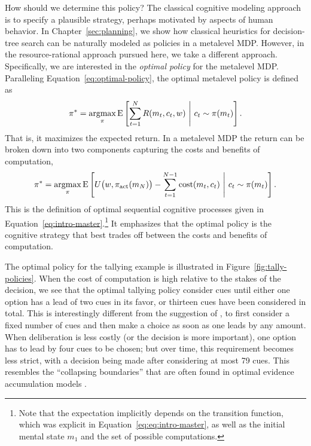 How should we determine this policy? The classical cognitive modeling approach is to specify a plausible strategy, perhaps motivated by aspects of human behavior. In Chapter~\ref{sec:planning}, we show how classical heuristics for decision-tree search can be naturally modeled as policies in a metalevel MDP. However, in the resource-rational approach pursued here, we take a different approach. Specifically, we are interested in the \emph{optimal policy} for the metalevel MDP. Paralleling Equation~\ref{eq:optimal-policy}, the optimal metalevel policy is defined as
%
\begin{equation}\label{eq:optimal-meta-policy}
  \pi^* = \argmax_\pi \expect{
    \sum_{t=1}^{\tmax} R(m_t, c_t, w)
  }{
    c_t \sim \pi(m_t)
  }.
\end{equation}
That is, it maximizes the expected return. In a metalevel MDP the return can be broken down into two components capturing the costs and benefits of computation,
\begin{equation}\label{eq:optimal-meta-policy-expanded}
  \pi^* = \argmax_\pi \expect{
    \Uterm[m_N] -
      \sum_{t=1}^{\tmax-1} \cost(m_t, c_t)
  }{
    c_t \sim \pi(m_t)
  }.
\end{equation}
This is the definition of optimal sequential cognitive processes given in Equation~\ref{eq:intro-master}.\footnote{%
  Note that the expectation implicitly depends on the transition function, which was explicit in Equation~\ref{eq:eq:intro-master}, as well as the initial mental state $m_1$ and the set of possible computations.
} It emphasizes that the optimal policy is the cognitive strategy that best trades off between the costs and benefits of computation.

The optimal policy for the tallying example is illustrated in Figure~\ref{fig:tally-policies}. When the cost of computation is high relative to the stakes of the decision, we see that the optimal tallying policy consider cues until either one option has a lead of two cues in its favor, or thirteen cues have been considered in total. This is interestingly different from the suggestion of \citet{gigerenzer2011heuristic}, to first consider a fixed number of cues and then make a choice as soon as one leads by any amount. When deliberation is less costly (or the decision is more important), one option has to lead by four cues to be chosen; but over time, this requirement becomes less strict, with a decision being made after considering at most 79 cues. This resembles the ``collapsing boundaries'' that are often found in optimal evidence accumulation models \citep{drugowitsch2012cost}.

